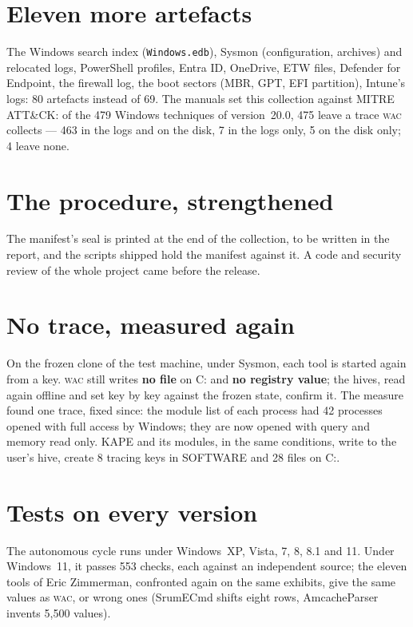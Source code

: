 \documentclass[10pt,a4paper,twocolumn]{article}
\newcommand{\wac}{\textsc{wac}}
\newcommand{\fichier}[1]{\texttt{#1}}
\begin{document}
\section{Eleven more artefacts}
The Windows search index (\fichier{Windows.edb}), Sysmon (configuration,
archives) and relocated logs, PowerShell profiles, Entra ID, OneDrive, ETW
files, Defender for Endpoint, the firewall log, the boot sectors (MBR, GPT,
EFI partition), Intune's logs: 80 artefacts instead of 69. The manuals set
this collection against MITRE ATT\&CK: of the 479 Windows techniques of
version~20.0, 475 leave a trace \wac{} collects --- 463 in the logs and on
the disk, 7 in the logs only, 5 on the disk only; 4 leave none.

\section{The procedure, strengthened}
The manifest's seal is printed at the end of the collection, to be written in
the report, and the scripts shipped hold the manifest against it. A code and security review
of the whole project came before the release.

\section{No trace, measured again}
On the frozen clone of the test machine, under Sysmon, each tool is started
again from a key. \wac{} still writes \textbf{no file} on C: and \textbf{no
registry value}; the hives, read again offline and set key by key against the
frozen state, confirm it. The measure found one trace, fixed since: the module
list of each process had 42 processes opened with full access by Windows;
they are now opened with query and memory read only. KAPE and its modules, in
the same conditions, write to the user's hive, create 8 tracing keys in
SOFTWARE and 28 files on C:.

\section{Tests on every version}
The autonomous cycle runs under Windows~XP, Vista, 7, 8, 8.1 and 11. Under
Windows~11, it passes 553 checks, each against an independent source; the
eleven tools of Eric Zimmerman, confronted again on the same exhibits, give the
same values as \wac{}, or wrong ones (SrumECmd shifts eight rows,
AmcacheParser invents 5,500 values).
\end{document}
